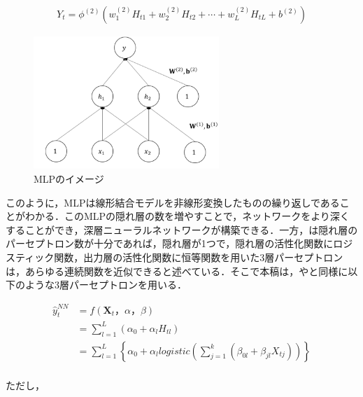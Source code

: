 \documentclass[a4paper，12pt]{jsarticle}
\begin{document}
\begin{equation}
  \begin{split}
    Y_t = \phi^{(2)}(w^{(2)}_{1} H_{t1} + w^{(2)}_{2} H_{t2} + \cdots + w^{(2)}_{L} H_{tL} + b^{(2)})
  \end{split}
\end{equation}

\begin{figure}
  \centering
  \caption{MLPのイメージ}
  \label{fig:mlp}
  \includegraphics[width=7cm]{./img/_ann_mlp.png}
\end{figure}

このように，MLPは線形結合モデルを非線形変換したものの繰り返しであることがわかる．このMLPの隠れ層の数を増やすことで，ネットワークをより深くすることができ，深層ニューラルネットワークが構築できる．一方，\cite{qi1999nonlinear}は隠れ層のパーセプトロン数が十分であれば，隠れ層が1つで，隠れ層の活性化関数にロジスティック関数，出力層の活性化関数に恒等関数を用いた3層パーセプトロンは，あらゆる連続関数を近似できると述べている．そこで本稿は，\cite{callen1996neural}や\cite{zhang2004neural}と同様に以下のような3層パーセプトロンを用いる．

\begin{equation}
  \begin{split}
    \hat{y}_t^{NN} 
    &= f({\bm{X}_t，\alpha，\beta}) \\
    &= \sum^{L}_{l=1} \left(\alpha_0 + \alpha_l H_{tl} \right) \\
    &= \sum^{L}_{l=1} \left\{ \alpha_0 + \alpha_l \textit{logistic} \left(\sum^{k}_{j=1} \left(\beta_{0l} + \beta_{jl} X_{tj} \right) \right) \right\} \\
  \end{split}
\end{equation}

ただし，
\end{document}
